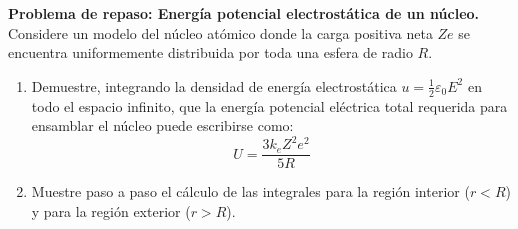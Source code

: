 \item \textbf{Problema de repaso: Energía potencial electrostática de un núcleo.}
Considere un modelo del núcleo atómico donde la carga positiva neta $Ze$ se encuentra uniformemente distribuida por toda una esfera de radio $R$.
\begin{enumerate}
    \item Demuestre, integrando la densidad de energía electrostática $u = \frac{1}{2} \varepsilon_0 E^2$ en todo el espacio infinito, que la energía potencial eléctrica total requerida para ensamblar el núcleo puede escribirse como:
    $$ U = \frac{3 k_e Z^2 e^2}{5 R} $$
    \item Muestre paso a paso el cálculo de las integrales para la región interior ($r < R$) y para la región exterior ($r > R$).
\end{enumerate}
